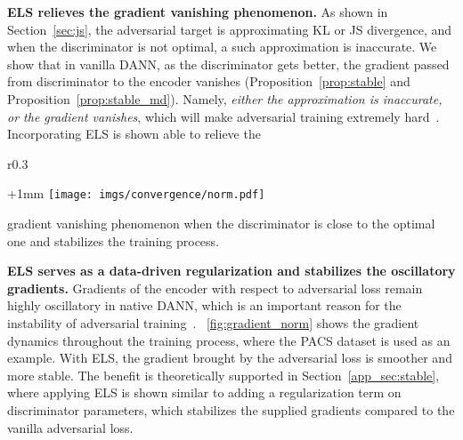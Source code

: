 \documentclass{article} \usepackage{iclr2023_conference,times}
\newcommand{\ls}[0]{ELS\xspace}
\begin{document}
\textbf{\ls relieves the gradient vanishing phenomenon.} As shown in Section~\ref{sec:js}, the adversarial target is approximating KL or JS divergence, and when the discriminator is not optimal, a such approximation is inaccurate. We show that in vanilla DANN, as the discriminator gets better, the gradient passed from discriminator to the encoder vanishes (Proposition~\ref{prop:stable} and Proposition~\ref{prop:stable_md}). Namely, \textit{either the approximation is inaccurate, or the gradient vanishes}, which will make adversarial training extremely hard~\citep{arjovsky2017towards}. Incorporating \ls is shown able to relieve the 
\begin{wrapfigure}{r}{0.3\textwidth}
  \begin{center}
  \advance\leftskip+1mm
  \renewcommand{\captionlabelfont}{\footnotesize}
    \vspace{-0.15in}  
    \texttt{[image: imgs/convergence/norm.pdf]}
    \vspace{-0.2in} 
    \caption{The sum of gradients provided to the encoder by the adversarial loss.}
    \label{fig:gradient_norm}
    \vspace{-0.4in} 
  \end{center}
\end{wrapfigure}
gradient vanishing phenomenon when the discriminator is close to the optimal one and stabilizes the training process.



\textbf{\ls serves as a data-driven regularization and stabilizes the  oscillatory gradients.} Gradients of the encoder with respect to adversarial loss remain highly oscillatory in native DANN, which is an important reason for the instability of adversarial training~\citep{mescheder2018training}. \figurename~\ref{fig:gradient_norm} shows the gradient dynamics throughout the training process, where the PACS dataset is used as an example. With \ls, the gradient brought by the adversarial loss is smoother and more stable. The benefit is theoretically supported in Section~\ref{app_sec:stable}, where applying \ls is shown similar to adding a regularization term on discriminator parameters, which stabilizes the supplied gradients compared to the vanilla adversarial loss. 

\vspace{-0.15cm}
\end{document}
